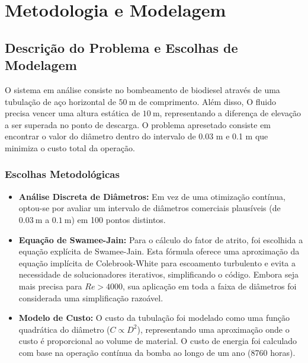 \documentclass[12pt, a4paper]{article}
\begin{document}
    \section{Metodologia e Modelagem}

        \subsection{Descrição do Problema e Escolhas de Modelagem}
        O sistema em análise consiste no bombeamento de biodiesel através de uma tubulação de aço horizontal de $50~\mathrm{m}$ de comprimento. Além disso, O fluido precisa vencer uma altura estática de $10~\mathrm{m}$, representando a diferença de elevação a ser superada no ponto de descarga. O problema apresetado consiste em encontrar o valor do diâmetro dentro do intervalo de 0.03 m e 0.1 m que minimiza o custo total da operação.

        \subsubsection{Escolhas Metodológicas}
        \begin{itemize}
            \item \textbf{Análise Discreta de Diâmetros:} Em vez de uma otimização contínua, optou-se por avaliar um intervalo de diâmetros comerciais plausíveis (de $0.03~\mathrm{m}$ a $0.1~\mathrm{m}$) em 100 pontos distintos.
            \item \textbf{Equação de Swamee-Jain:} Para o cálculo do fator de atrito, foi escolhida a equação explícita de Swamee-Jain. Esta fórmula oferece uma aproximação da equação implícita de Colebrook-White para escoamento turbulento e evita a necessidade de solucionadores iterativos, simplificando o código. Embora seja mais precisa para $Re > 4000$, sua aplicação em toda a faixa de diâmetros foi considerada uma simplificação razoável. \cite{Swamee}
            \item \textbf{Modelo de Custo:} O custo da tubulação foi modelado como uma função quadrática do diâmetro ($C \propto D^2$), representando uma aproximação onde o custo é proporcional ao volume de material. O custo de energia foi calculado com base na operação contínua da bomba ao longo de um ano (8760 horas).
        \end{itemize}
        \vfill
\end{document}
